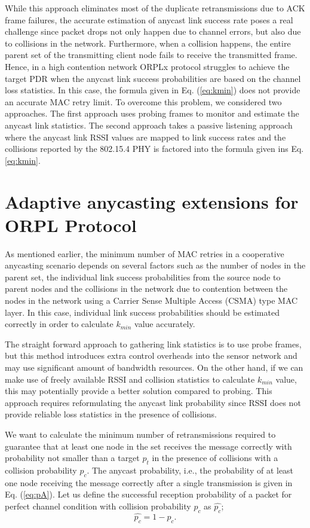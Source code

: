 \documentclass[conference]{IEEEtran}
\begin{document}
While this approach eliminates most of the duplicate retransmissions due to ACK frame failures, the accurate estimation of anycast link success rate poses a real challenge since packet drops not only happen due to channel errors, but also due to collisions in the network. Furthermore, when a collision happens, the entire parent set of the transmitting client node fails to receive the transmitted frame. Hence, in a high contention network ORPLx protocol struggles to achieve the target PDR when the anycast link success probabilities are based on the channel loss statistics. In this case, the formula given in Eq. (\ref{eq:kmin}) does not provide an accurate MAC retry limit. To overcome this problem, we considered two approaches. The first approach uses probing frames to monitor and estimate the anycast link statistics. The second approach takes a passive listening approach where the anycast link RSSI values are mapped to link success rates and the collisions reported by the 802.15.4 PHY is factored into the formula given ins Eq. \ref{eq:kmin}.

\section{Adaptive anycasting extensions for ORPL Protocol}

As mentioned earlier, the minimum number of MAC retries in a cooperative anycasting scenario depends on several factors such as the number of nodes in the parent set, the individual link success probabilities from the source node to parent nodes and the collisions in the network due to contention between the nodes in the network using a Carrier Sense Multiple Access (CSMA) type MAC layer. In this case, individual link success probabilities should be estimated correctly in order to calculate $k_{min}$ value accurately. 

The straight forward approach to gathering link statistics is to use probe frames, but this method introduces extra control overheads into the sensor network and may use significant amount of bandwidth resources. On the other hand, if we can make use of freely available RSSI and collision statistics to calculate $k_{min}$ value, this may potentially provide a better solution compared to probing. This approach requires reformulating the anycast link probability since RSSI does not provide reliable loss statistics in the presence of collisions. 

We want to calculate the minimum number of retransmissions
required to guarantee that at least one node in the set receives the
message correctly with probability not smaller than a target $p_t$ in the presence of collisions with a collision probability $p_c$. The anycast probability, i.e., the probability of
at least one node receiving the message correctly after a single
transmission is given in Eq. (\ref{eq:pA}). Let us define the successful reception probability of a packet for perfect channel condition with collision probability $p_c$ as $\hat{p_c}$;
\begin{equation}
    \hat{p_c} = 1-p_c. \label{eq:pC}
\end{equation}
\end{document}
